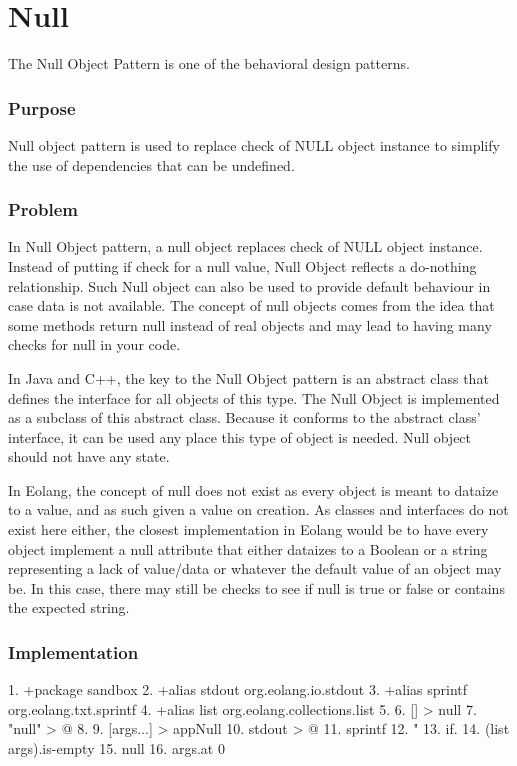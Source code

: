 \documentclass[12pt]{book}
\begin{document}
\section{Null}
The Null Object Pattern is one of the behavioral design patterns.

\subsubsection{Purpose}
Null object pattern is used to replace check of NULL object instance to simplify the use of dependencies that can be undefined.

\subsubsection{Problem}
In Null Object pattern, a null object replaces check of NULL object instance. Instead of putting if check for a null value, Null Object reflects a do-nothing relationship. Such Null object can also be used to provide default behaviour in case data is not available. The concept of null objects comes from the idea that some methods return null instead of real objects and may lead to having many checks for null in your code. 


In Java and C++, the key to the Null Object pattern is an abstract class that defines the interface for all objects of this type. The Null Object is implemented as a subclass of this abstract class. Because it conforms to the abstract class' interface, it can be used any place this type of object is needed. Null object should not have any state.


In Eolang, the concept of null does not exist as every object is meant to dataize to a value, and as such given a value on creation. As classes and interfaces do not exist here either, the closest implementation in Eolang would be to have every object implement a null attribute that either dataizes to a Boolean or a string representing a lack of value/data or whatever the default value of an object may be. In this case, there may still be checks to see if null is true or false or contains the expected string.

\subsubsection{Implementation}
\begin{ffcode}
1.	+package sandbox
2.	+alias stdout org.eolang.io.stdout
3.	+alias sprintf org.eolang.txt.sprintf
4.	+alias list org.eolang.collections.list
5.	
6.	[] > null
7.	  "null" > @
8.	
9.	[args...] > appNull
10.	  stdout > @
11.	    sprintf
12.	      "%
13.	      if.
14.	        (list args).is-empty
15.	        null
16.	        args.at 0 

\end{ffcode}
\end{document}
